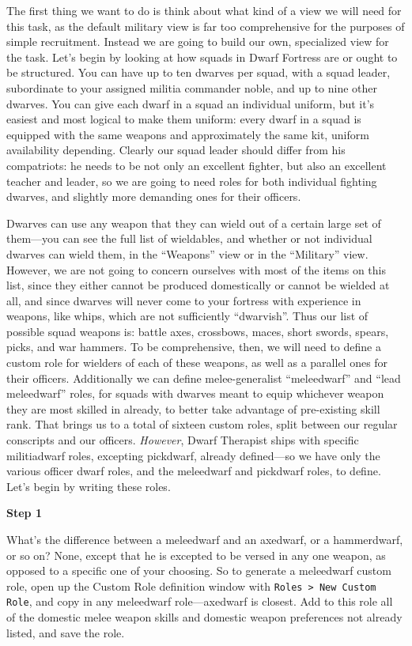 \documentclass[]{article}
\newcommand{\step}[1] {
\vspace{12pt}
\noindent \textbf{Step #1}
}
\begin{document}
The first thing we want to do is think about what kind of a view we will need for this task, as the
default military view is far too comprehensive for the purposes of simple recruitment. Instead we are
going to build our own, specialized view for the task. Let's begin by looking at how squads in Dwarf
Fortress are or ought to be structured. You can have up to ten dwarves per squad, with a squad leader,
subordinate to your assigned militia commander noble, and up to nine other dwarves. You can give each
dwarf in a squad an individual uniform, but it's easiest and most logical to make them uniform: every
dwarf in a squad is equipped with the same weapons and approximately the same kit, uniform availability
depending. Clearly our squad leader should differ from his compatriots: he needs to be not only an
excellent fighter, but also an excellent teacher and leader, so we are going to need roles for both
individual fighting dwarves, and slightly more demanding ones for their officers.

Dwarves can use any weapon that they can wield out of a certain large set of them---you can see the full
list of wieldables, and whether or not individual dwarves can wield them, in the ``Weapons'' view or in
the ``Military'' view. However, we are not going to concern ourselves with most of the items on this
list, since they either cannot be produced domestically or cannot be wielded at all, and since dwarves
will never come to your fortress with experience in weapons, like whips, which are not
sufficiently ``dwarvish''. Thus our list of possible squad weapons is: battle axes, crossbows, maces,
short swords, spears, picks, and war hammers. To be comprehensive, then, we will need to define a custom
role for wielders of each of these weapons, as well as a parallel ones for their officers. Additionally
we can define melee-generalist ``meleedwarf'' and ``lead meleedwarf'' roles, for squads with dwarves
meant to equip whichever weapon they are most skilled in already, to better take advantage of
pre-existing skill rank. That brings us to a total of sixteen custom roles, split between our regular
conscripts and our officers. \emph{However}, Dwarf Therapist ships with specific militiadwarf roles,
excepting pickdwarf, already defined---so we have only the various officer dwarf roles, and the
meleedwarf and pickdwarf roles, to define. Let's begin by writing these roles.

\step{1}
What's the difference between a meleedwarf and an axedwarf, or a hammerdwarf, or so on? None, except that
he is excepted to be versed in any one weapon, as opposed to a specific one of your choosing. So to
generate a meleedwarf custom role, open up the Custom Role definition window with \texttt{Roles > New
Custom Role}, and copy in any meleedwarf role---axedwarf is closest. Add to this role all of the
domestic melee weapon skills and domestic weapon preferences not already listed, and save the role.
\end{document}
